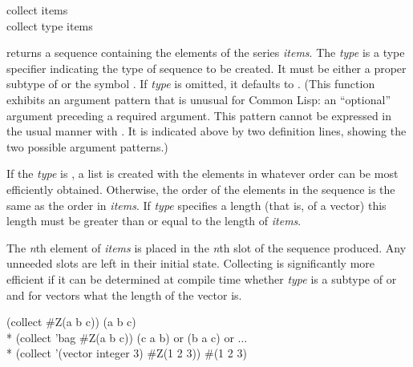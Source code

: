 \begin{defun}[Function]
collect items \\
collect type items

 returns a sequence containing the elements of the series {\it
items}.  The {\it type} is a type specifier indicating the type of sequence
to be created.  It must be either a proper subtype of  or the
symbol .  If {\it type} is omitted, it defaults to .
(This function exhibits an argument pattern that is unusual for Common
Lisp:  an ``optional'' argument preceding a required argument.  This
pattern cannot be expressed in the usual manner with .  It
is indicated above by two definition lines, showing the two possible
argument patterns.)

If the {\it type} is , a list is created with the elements in
whatever order can be most efficiently obtained.  Otherwise, the order of
the elements in the sequence is the same as the order in {\it items}.  If
{\it type} specifies a length (that is, of a vector) this length must be
greater than or equal to the length of {\it items}.

The {\it n\/}th element of {\it items} is
placed in the {\it n\/}th slot of the sequence produced.  Any unneeded slots are
left in their initial state.  Collecting is significantly more efficient if
it can be determined at compile time whether {\it type} is a subtype of
 or  and for vectors what the length of the vector is.
\begin{lisp}
(collect \#Z(a b c)) {\EV} (a b c) \\*
(collect 'bag \#Z(a b c)) {\EV} (c a b) {\rm or} (b a c) {\rm or $\ldots$} \\*
(collect '(vector integer 3) \#Z(1 2 3)) {\EV} \#(1 2 3)
\end{lisp}
\end{defun}

